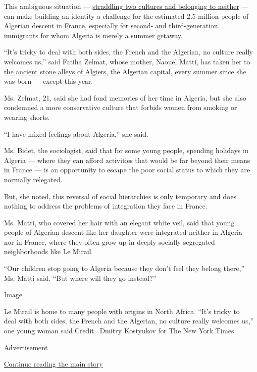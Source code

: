 This ambiguous situation ---
\href{https://www.nytimes.com/2015/08/16/world/africa/france-algeria-immigration-discrimination-racism.html}{straddling
two cultures and belonging to neither} --- can make building an identity
a challenge for the estimated 2.5 million people of Algerian descent in
France, especially for second- and third-generation immigrants for whom
Algeria is merely a summer getaway.

``It's tricky to deal with both sides, the French and the Algerian, no
culture really welcomes us,'' said Fatiha Zelmat, whose mother, Naouel
Matti, has taken her to
\href{https://www.nytimes.com/2019/05/05/world/africa/algeria-casbah-preservation-plan.html}{the
ancient stone alleys of Algiers}, the Algerian capital, every summer
since she was born --- except this year.

Ms. Zelmat, 21, said she had fond memories of her time in Algeria, but
she also condemned a more conservative culture that forbids women from
smoking or wearing shorts.

``I have mixed feelings about Algeria,'' she said.

Ms. Bidet, the sociologist, said that for some young people, spending
holidays in Algeria --- where they can afford activities that would be
far beyond their means in France --- is an opportunity to escape the
poor social status to which they are normally relegated.

But, she noted, this reversal of social hierarchies is only temporary
and does nothing to address the problems of integration they face in
France.

Ms. Matti, who covered her hair with an elegant white veil, said that
young people of Algerian descent like her daughter were integrated
neither in Algeria nor in France, where they often grow up in deeply
socially segregated neighborhoods like Le Mirail.

``Our children stop going to Algeria because they don't feel they belong
there,'' Ms. Matti said. ``But where will they go instead?''

Image

Le Mirail is home to many people with origins in North Africa. ``It's
tricky to deal with both sides, the French and the Algerian, no culture
really welcomes us,'' one young woman said.Credit...Dmitry Kostyukov for
The New York Times

Advertisement

\protect\hyperlink{after-bottom}{Continue reading the main story}

